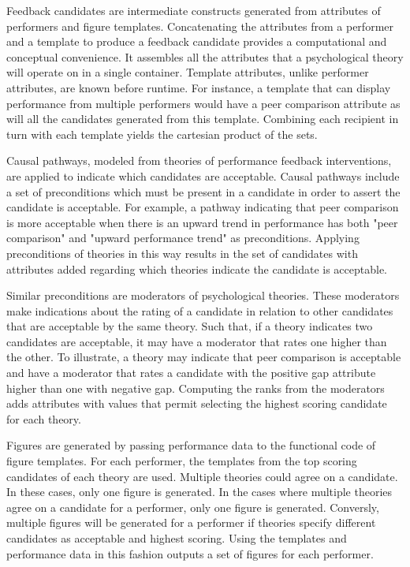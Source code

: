 \documentclass{amia}
\begin{document}
Feedback candidates are intermediate constructs generated from attributes of performers and figure templates.
Concatenating the attributes from a performer and a template to produce a feedback candidate provides a computational and conceptual convenience.
It assembles all the attributes that a psychological theory will operate on in a single container.
Template attributes, unlike performer attributes, are known before runtime.
For instance, a template that can display performance from multiple performers would have a peer comparison attribute as will all the candidates generated from this template.
Combining each recipient in turn with each template yields the cartesian product of the sets.

Causal pathways, modeled from theories of performance feedback interventions\cite{kluger1996}, are applied to indicate which candidates are acceptable.
Causal pathways include a set of preconditions which must be present in a candidate in order to assert the candidate is acceptable.
For example, a pathway indicating that peer comparison is more acceptable when there is an upward trend in performance has both "peer comparison" and "upward performance trend" as preconditions.
Applying preconditions of theories in this way results in the set of candidates with attributes added regarding which theories indicate the candidate is acceptable.

Similar preconditions are moderators of psychological theories.
These moderators make indications about the rating of a candidate in relation to other candidates that are acceptable by the same theory. 
Such that, if a theory indicates two candidates are acceptable, it may have a moderator that rates one higher than the other.
To illustrate, a theory may indicate that peer comparison is acceptable and have a moderator that rates a candidate with the positive gap attribute higher than one with negative gap.
Computing the ranks from the moderators adds attributes with values that permit selecting the highest scoring candidate for each theory.

Figures are generated by passing performance data to the functional code of figure templates.
For each performer, the templates from the top scoring candidates of each theory are used.
Multiple theories could agree on a candidate.  
In these cases, only one figure is generated.
In the cases where multiple theories agree on a candidate for a performer, only one figure is generated.
Conversly, multiple figures will be generated for a performer if theories specify different candidates as acceptable and highest scoring.
Using the templates and performance data in this fashion outputs a set of figures for each performer.
\end{document}
